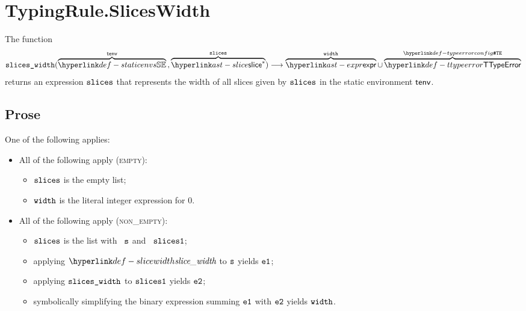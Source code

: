 \begin{mathpar}
\end{mathpar}

\section{TypingRule.SlicesWidth \label{sec:TypingRule.SlicesWidth}}
\hypertarget{def-sliceswidth}{}
The function
\[
  \sliceswidth(\overname{\staticenvs}{\tenv} \aslsep \overname{\slice^*}{\vslices}) \aslto
  \overname{\expr}{\vwidth} \cup \overname{\TTypeError}{\TypeErrorConfig}
\]
returns an expression $\vslices$ that represents the width of all slices given by $\vslices$
in the static environment $\tenv$.

\subsection{Prose}
One of the following applies:
\begin{itemize}
  \item All of the following apply (\textsc{empty}):
  \begin{itemize}
    \item $\vslices$ is the empty list;
    \item $\vwidth$ is the literal integer expression for $0$.
  \end{itemize}

  \item All of the following apply (\textsc{non\_empty}):
  \begin{itemize}
    \item $\vslices$ is the list with \head\ $\vs$ and \tail\ $\slicesone$;
    \item applying $\slicewidth$ to $\vs$ yields $\veone$;
    \item applying $\sliceswidth$ to $\slicesone$ yields $\vetwo$;
    \item symbolically simplifying the binary expression summing $\veone$ with $\vetwo$ yields $\vwidth$\ProseOrTypeError.
  \end{itemize}
\end{itemize}

